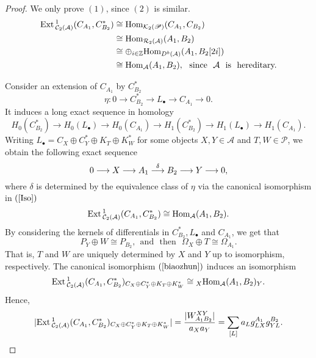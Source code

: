 \documentclass[reqno,12pt]{amsart}
\numberwithin{equation}{section}
\def\Ext{\mbox{\rm Ext}\,} \def\Hom{\mbox{\rm Hom}} \def\dim{\mbox{\rm dim}\,} \def\Iso{\mbox{\rm Iso}\,}
\def\A{{\mathcal A}}\def\P{{\mathscr{P}}}
\theoremstyle{plain} %
\theoremstyle{definition} %
\begin{document}
\begin{proof}
We only prove $(1)$, since $(2)$ is similar.
\begin{equation}\label{Iso}
\begin{split}
\Ext^1_{\mathcal{C}_2(\mathcal{A})}(C_{A_1},C_{B_2}^\ast)&\cong\Hom_{{\mathcal {K}}_2(\mathscr{P})}(C_{A_1},C_{B_2})\\
&\cong\Hom_{\mathcal{R}_2(\mathcal{A})}(A_1,B_2)\\
&\cong\oplus_{i\in\mathbb{Z}}\Hom_{D^b(\A)}(A_1,B_2[2i])\\
&\cong\Hom_{\A}(A_1,B_2),~~\mbox{since}~~\A~~\mbox{is}~~\mbox{hereditary.}
\end{split}\end{equation}

Consider an extension of $C_{A_1}$ by $C_{B_2}^\ast$
$$\eta: 0\longrightarrow C_{B_2}^\ast\longrightarrow L_{\bullet}\longrightarrow C_{A_1}\longrightarrow 0.$$ It induces a long exact sequence in homology
$$H_0(C_{B_2}^\ast)\longrightarrow H_0(L_\bullet)\longrightarrow H_0(C_{A_1})\longrightarrow
H_1(C_{B_2}^\ast)\longrightarrow H_1(L_\bullet)\longrightarrow H_1(C_{A_1}).$$
Writing $L_\bullet=C_X\oplus C_Y^\ast \oplus K_T\oplus K_W^\ast$ for some objects $X,Y\in\A$ and $T,W\in\P$, we obtain the following exact sequence
$$0\longrightarrow X\longrightarrow A_1\stackrel{\delta}{\longrightarrow} B_2\longrightarrow Y\longrightarrow 0,$$
where $\delta$ is determined by the equivalence class of $\eta$ via the canonical isomorphism in $(\ref{Iso})$
\begin{equation}\label{biaozhun}\Ext^1_{\mathcal{C}_2(\mathcal{A})}(C_{A_1},C_{B_2}^\ast)\cong\Hom_{\A}(A_1,B_2).\end{equation}
By considering the kernels of differentials in $C_{B_2}^\ast, L_\bullet$ and $C_{A_1}$, we get that
$$P_Y\oplus W\cong P_{B_2},~~\mbox{and~~then}~~~\Omega_X\oplus T\cong \Omega_{A_1}.$$
That is, $T$ and $W$ are uniquely determined by $X$ and $Y$ up to isomorphism, respectively.
The canonical isomorphism $(\ref{biaozhun})$ induces an isomorphism
\begin{equation*}
\Ext^1_{\mathcal{C}_2(\mathcal{A})}(C_{A_1},C_{B_2}^\ast)_{C_X\oplus C_Y^\ast\oplus K_T\oplus K_W^\ast}
\cong {}_X\Hom_{\A}(A_1,B_2)_Y.
\end{equation*}
Hence, \begin{equation*}\begin{split}|\Ext^1_{\mathcal{C}_2(\mathcal{A})}(C_{A_1},C_{B_2}^\ast)_{C_X\oplus C_Y^\ast\oplus K_T\oplus K_W^\ast}|=\frac{|W_{A_1B_2}^{XY}|}{a_Xa_Y}
=\sum_{[L]}a_Lg_{LX}^{A_1}g_{YL}^{B_2}.\end{split}\end{equation*}


\end{proof}
\end{document}
